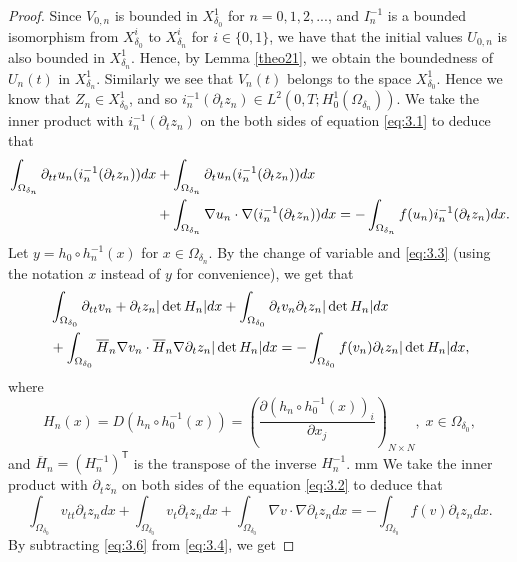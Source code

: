 \documentclass[11pt]{amsart}
\begin{document}
\begin{proof}
Since $V_{0,n} $ is bounded in $X^1_{\delta_0}$ for $n=0,1,2,...$, and $I_n^{-1} $ is a bounded isomorphism from $X_{\delta_0}^i$ to $X_{\delta_n}^i$ for $i\in \{0,1\}$, we have that the initial values $U_{0,n}$ is also bounded in $X_{\delta_n}^1$. Hence, by Lemma \ref{theo21}, we obtain the boundedness of $U_n(t)$ in $X_{\delta_n}^1$. Similarly we see that $V_n(t)$ belongs to the space $X_{\delta_0}^1$. Hence we know that $Z_n \in X_{\delta_0}^1$, and so $i_n^{-1}(\partial_t z_n) \in L^2(0,T;H_0^1(\Omega_{\delta_n}))$. We take the inner product with $i_n^{-1}(\partial_t z_n)$ on the both sides of equation \eqref{eq:3.1} to deduce that
\begin{align}\label{eq:3.3}
\int_{\Omega_{\delta_n}}\partial_{tt}u_n (i_n^{-1}(\partial_t z_n)) dx &+ \int_{\Omega_{\delta_n}}\partial_tu_n (i_n^{-1}(\partial_t z_n)) dx \notag\\
&+\int_{\Omega_{\delta_n}}\nabla u_n \cdot \nabla (i_n^{-1}(\partial_tz_n))dx 
=-\int_{\Omega_{\delta_n}}f(u_n) i_n^{-1}(\partial_t z_n) dx.
\end{align}
Let $y = h_0 \circ h_n^{-1}(x)$ for $x \in \Omega_{\delta_n}$. By the change of variable and \eqref{eq:3.3} (using the notation $x$ instead of $y$ for convenience), we get  that
\begin{align} \label{eq:3.4}
&\int_{\Omega_{\delta_0}}\partial_{tt}v_n + \partial_t z_n|\det H_n|dx+ \int_{\Omega_{\delta_0}}\partial_{t}v_n  \partial_t z_n|\det H_n|dx\notag \\
&+\int_{\Omega_{\delta_0}}\overline{H}_n\nabla v_n \cdot \overline{H}_n\nabla \partial_t z_n |\det H_n| dx =-\int_{\Omega_{\delta_0}} f(v_n) \partial_t z_n|\det H_n| dx,
\end{align}
where
\begin{equation*}\label{eq:3.5}
H_n(x)=D(h_n\circ h_0^{-1}(x))=\left(\dfrac{\partial (h_n\circ h_0^{-1}(x))_i}{\partial x_j}\right)_{N\times N}, \; x\in \Omega_{\delta_0},
\end{equation*}
and $\overline{H}_n=(H_n^{-1})^{\mathsf{T}}$ is the transpose of the inverse $H_n^{-1}$.
 mm
We take the inner product with $\partial_t z_n$ on both sides of the equation \eqref{eq:3.2} to deduce that
\begin{equation}\label{eq:3.6}
\int_{\Omega_{\delta_0}}v_{tt}\partial_t z_n dx+\int_{\Omega_{\delta_0}}v_t \partial_t z_n dx+ \int_{\Omega_{\delta_0}}\nabla v\cdot \nabla \partial_t z_ndx=-\int_{\Omega_{\delta_0}}f(v) \partial_t z_ndx.\end{equation}
By subtracting \eqref{eq:3.6} from \eqref{eq:3.4}, we get

\end{proof}
\end{document}
